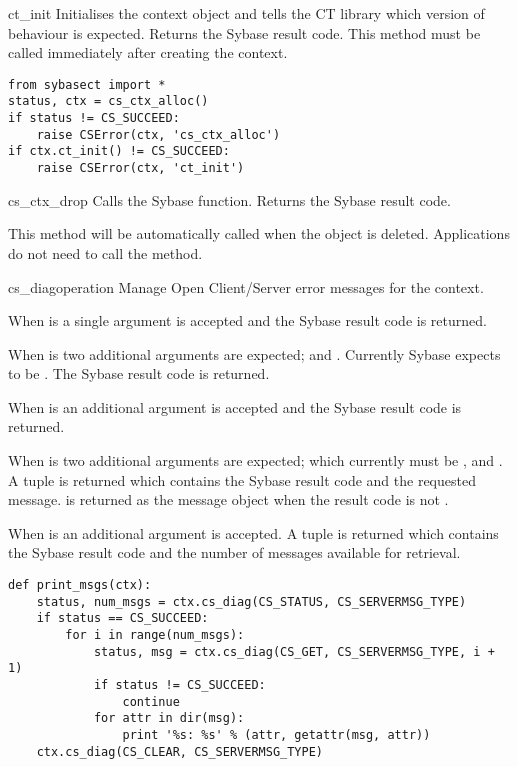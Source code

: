 \begin{methoddesc}[CS_CONTEXT]{ct_init}{}
Initialises the context object and tells the CT library which version
of behaviour is expected.  Returns the Sybase result code.  This
method must be called immediately after creating the context.

\begin{verbatim}
from sybasect import *
status, ctx = cs_ctx_alloc()
if status != CS_SUCCEED:
    raise CSError(ctx, 'cs_ctx_alloc')
if ctx.ct_init() != CS_SUCCEED:
    raise CSError(ctx, 'ct_init')
\end{verbatim}
\end{methoddesc}

\begin{methoddesc}[CS_CONTEXT]{cs_ctx_drop}{}
Calls the Sybase  function.  Returns the
Sybase result code.

This method will be automatically called when the 
object is deleted.  Applications do not need to call the method.
\end{methoddesc}

\begin{methoddesc}[CS_CONTEXT]{cs_diag}{operation \optional{, \ldots}}
Manage Open Client/Server error messages for the context.

When  is  a single argument is accepted
and the Sybase result code is returned.

When  is  two additional arguments
are expected;  and .  Currently Sybase expects
 to be .  The Sybase result code is
returned.

When  is  an additional 
argument is accepted and the Sybase result code is returned.

When  is  two additional arguments are
expected;  which currently must be ,
and .  A tuple is returned which contains the Sybase result
code and the requested  message.   is
returned as the message object when the result code is not
.

When  is  an additional 
argument is accepted.  A tuple is returned which contains the Sybase
result code and the number of messages available for retrieval.

\begin{verbatim}
def print_msgs(ctx):
    status, num_msgs = ctx.cs_diag(CS_STATUS, CS_SERVERMSG_TYPE)
    if status == CS_SUCCEED:
        for i in range(num_msgs):
            status, msg = ctx.cs_diag(CS_GET, CS_SERVERMSG_TYPE, i + 1)
            if status != CS_SUCCEED:
                continue
            for attr in dir(msg):
                print '%s: %s' % (attr, getattr(msg, attr))
    ctx.cs_diag(CS_CLEAR, CS_SERVERMSG_TYPE)
\end{verbatim}
\end{methoddesc}

